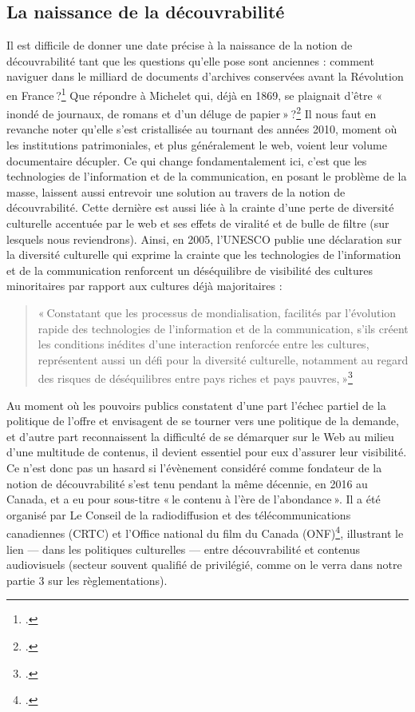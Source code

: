 \subsection{La naissance de la découvrabilité}

Il est difficile de donner une date précise à la naissance de la notion de découvrabilité tant que les questions qu’elle pose sont anciennes : comment naviguer dans le milliard de documents d’archives conservées avant la Révolution en France ?\footcite{poncet2022} Que répondre à Michelet qui, déjà en 1869, se plaignait d’être « inondé de journaux, de romans et d’un déluge de papier » ?\footcite[p. 47]{bermes2024} Il nous faut en revanche noter qu’elle s’est cristallisée au tournant des années 2010, moment où les institutions patrimoniales, et plus généralement le web, voient leur volume documentaire décupler. Ce qui change fondamentalement ici, c’est que les technologies de l’information et de la communication, en posant le problème de la masse, laissent aussi entrevoir une solution au travers de la notion de découvrabilité. Cette dernière est aussi liée à la crainte d’une perte de diversité culturelle accentuée par le web et ses effets de viralité et de bulle de filtre (sur lesquels nous reviendrons). Ainsi, en 2005, l’UNESCO publie une déclaration sur la diversité culturelle qui exprime la crainte que les technologies de l’information et de la communication renforcent un déséquilibre de visibilité des cultures minoritaires par rapport aux cultures déjà majoritaires :

\begin{quote}
	« Constatant que les processus de mondialisation, facilités par l’évolution rapide des technologies de l’information et de la communication, s’ils créent les conditions inédites d’une interaction renforcée entre les cultures, représentent aussi un défi pour la diversité culturelle, notamment au regard des risques de déséquilibres entre pays riches et pays pauvres, »\footcite{zotero-266}
\end{quote}

Au moment où les pouvoirs publics constatent d’une part l’échec partiel de la politique de l’offre et envisagent de se tourner vers une politique de la demande, et d’autre part reconnaissent la difficulté de se démarquer sur le Web au milieu d’une multitude de contenus, il devient essentiel pour eux d’assurer leur visibilité. Ce n’est donc pas un hasard si l’évènement considéré comme fondateur de la notion de découvrabilité s’est tenu pendant la même décennie, en 2016 au Canada, et a eu pour sous-titre « le contenu à l’ère de l’abondance ». Il a été organisé par Le Conseil de la radiodiffusion et des télécommunications canadiennes (CRTC) et l’Office national du film du Canada (ONF)\footcite[Ironie du sort, le site orignellement lié au sommet est indisponible mais a été sauvegardé sur Internet Archive]{conseildelaradiodiffusionetdestelecommunicationscanadiennescrtcetlofficenationaldufilmducanadaonf2016}, illustrant le lien — dans les politiques culturelles — entre découvrabilité et contenus audiovisuels (secteur souvent qualifié de privilégié, comme on le verra dans notre partie 3 sur les règlementations).


